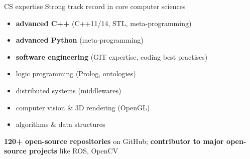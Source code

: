 \documentclass[compress]{beamer}
\begin{document}
\begin{frame}{CS expertise}
%
        Strong track record in core computer sciences

        \begin{itemize}
            \item \textbf{advanced C++} (C++11/14, STL, meta-programming)
            \item \textbf{advanced Python} (meta-programming)
            \item \textbf{software engineering} (GIT expertise, coding best practises)
            \item logic programming (Prolog, ontologies)
            \item distributed systems (middlewares)
            \item computer vision \& 3D rendering (OpenGL)
            \item algorithms \& data structures
        \end{itemize}

        \textbf{120+ open-source repositories} on GitHub; \textbf{contributor to major
        open-source projects} like ROS, OpenCV



\end{frame}
\end{document}
